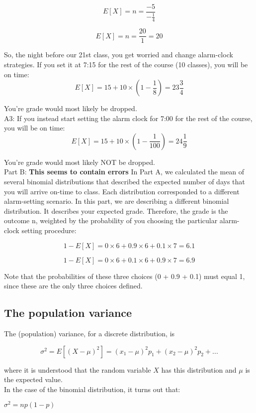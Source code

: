 \documentclass[12pt,a4paper]{article}
\theoremstyle{regla}
\theoremstyle{remark}
\theoremstyle{definition}
\theoremstyle{nonumberbreak}
\begin{document}
\begin{xmpl}
$$E[X] = n = \frac{- 5}{- \frac{1}{4}} $$

$$E[X] = n = \frac{20}{1} = 20 $$

So, the night before our 21st class, you get worried and change alarm-clock strategies. If you set it at 7:15 for the rest of the course (10 classes), you will be on time:
$$E[X] = 15 + 10 \times (1 - \frac{1}{8}) = 23 \frac {3}{4} $$

You're grade would most likely be dropped.\\

A3: If you instead start setting the alarm clock for 7:00 for the rest of the course, you will be on time:
$$E[X] = 15 + 10 \times (1 - \frac{1}{100}) = 24 \frac{1}{9} $$

You're grade would most likely NOT be dropped.\\

Part B: \textbf{This seems to contain errors} In Part A, we calculated the mean of several binomial distributions that described the expected number of days that you will arrive on-time to class. Each distribution corresponded to a different alarm-setting scenario. In this part, we are describing a different binomial distribution. It describes your expected grade. Therefore, the grade is the outcome n, weighted by the probability of you choosing the particular alarm-clock setting procedure:

$$1 - E[X] = 0 \times 6 + 0.9 \times 6 + 0.1 \times 7 = 6.1 $$

$$1 - E[X] = 0 \times 6 + 0.1 \times 6 + 0.9 \times 7 = 6.9 $$

Note that the probabilities of these three choices (0 + 0.9 + 0.1) must equal 1, since these are the only three choices defined.

\end{xmpl}

 



\subsection{The population variance}
\begin{fbox}
\begin{minipage}{0.97\textwidth}
The (population) variance, for a discrete distribution, is

$$\sigma^2 = E\left[ \left ( X-\mu \right ) ^2 \right ] = (x_1 - \mu)^2 p_1 + (x_2 - \mu)^2 p_2 + ...  $$

where it is understood that the random variable $X$ has this distribution and $\mu$ is the expected value.\\

In the case of the binomial distribution, it turns out that:

$\sigma^2 = np(1 - p)$

\end{minipage}
\end{fbox}
\end{document}
